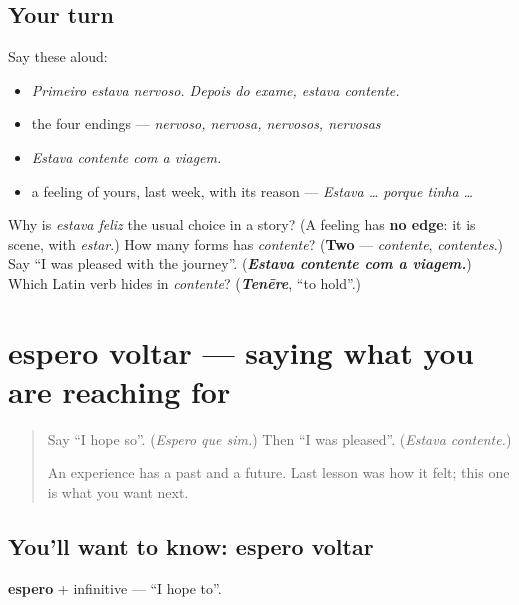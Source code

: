 \subsection*{Your turn}
Say these aloud:

\begin{itemize}
\raggedright
  \item \emph{Primeiro estava nervoso. Depois do exame, estava contente.}
  \item the four endings — \emph{nervoso, nervosa, nervosos, nervosas}
  \item \emph{Estava contente com a viagem.}
  \item a feeling of yours, last week, with its reason — \emph{Estava … porque tinha …}
\end{itemize}

\begin{tcolorbox}[breakable,colback=teal!4,colframe=teal!35!black,title={Before you move on}]
Why is \emph{estava feliz} the usual choice in a story? (A feeling has \textbf{no edge}: it is scene, with \emph{estar}.) How many forms has \emph{contente}? (\textbf{Two} — \emph{contente}, \emph{contentes}.) Say \textquotedblleft{}I was pleased with the journey\textquotedblright{}. (\emph{\textbf{Estava contente com a viagem.}}) Which Latin verb hides in \emph{contente}? (\emph{\textbf{Tenēre}}, \textquotedblleft{}to hold\textquotedblright{}.)
\end{tcolorbox}
\section[espero voltar]{espero voltar — saying what you are reaching for}

\label{lesson:PT-C265-espero-voltar}



\begin{quote}
Say \textquotedblleft{}I hope so\textquotedblright{}. (\emph{Espero que sim.}) Then \textquotedblleft{}I was pleased\textquotedblright{}. (\emph{Estava contente.})

An experience has a past and a future. Last lesson was how it felt; this one is what you want next.
\end{quote}

\subsection*{You'll want to know: espero voltar}
\textbf{espero} + infinitive — \textquotedblleft{}I hope to\textquotedblright{}.

